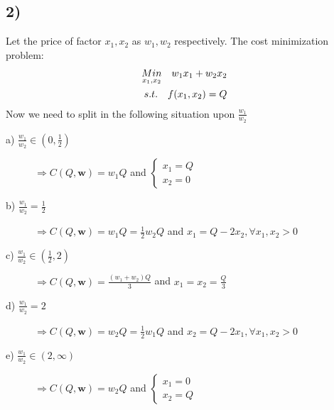 \documentclass{article}
\begin{document}
\subsection*{2)}
Let the price of factor $x_1, x_2$ as $w_1, w_2$ respectively. The cost minimization problem:
\begin{align}
\notag \underset{x_1,x_2}{Min} \quad w_1 x_1 + w_2 x_2\\ 
\notag s.t.\quad f(x_1, x_2) = Q
\end{align}
Now we need to split in the following situation upon $\frac{w_1}{w_2}$
\begin{description}
\item[a) $\frac{w_1}{w_2}\in (0,\frac{1}{2})$] $\Rightarrow C(Q, \bm{w}) = w_1 Q$ and $\begin{cases}x_1=Q\\x_2=0\end{cases}$

\item[b) $\frac{w_1}{w_2} = \frac{1}{2}$] $\Rightarrow C(Q, \bm{w}) = w_1 Q = \frac{1}{2} w_2 Q$ and $x_1 = Q-2x_2,\forall x_1, x_2>0$

\item[c) $\frac{w_1}{w_2}\in (\frac{1}{2},2)$] $\Rightarrow C(Q, \bm{w}) = \frac{(w_1 +w_2)Q}{3}$ and $x_1=x_2 =\frac{Q}{3}$

\item[d) $\frac{w_1}{w_2} = 2$]  $\Rightarrow C(Q, \bm{w}) = w_2 Q = \frac{1}{2} w_1 Q$ and $x_2 = Q-2x_1,\forall x_1, x_2>0$

\item[e) $\frac{w_1}{w_2}\in (2,\infty)$] $\Rightarrow C(Q, \bm{w}) = w_2 Q$ and $\begin{cases}x_1=0\\x_2=Q\end{cases}$
\end{description}
\end{document}
